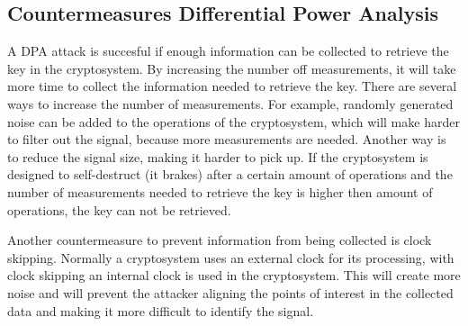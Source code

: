 \subsection{Countermeasures Differential Power Analysis}
A DPA attack is succesful if enough information can be collected to retrieve the key in the cryptosystem. By increasing the number off measurements, it will take more time to collect the information needed to retrieve the key. 
There are several ways to increase the number of measurements. For example, randomly generated noise can be added to the operations of the cryptosystem, which will make harder to filter out the signal, because more measurements are needed. Another way is to reduce the signal size, making it harder to pick up. 
If the cryptosystem is designed to self-destruct (it brakes) after a certain amount of operations and the number of measurements needed to retrieve the key is higher then amount of operations, the key can not be retrieved.

Another countermeasure to prevent information from being collected is clock skipping. Normally a cryptosystem uses an external clock for its processing, with clock skipping an internal clock is used in the cryptosystem. This will create more noise and will prevent the attacker aligning the points of interest in the collected data and making it more difficult to identify the signal. 




